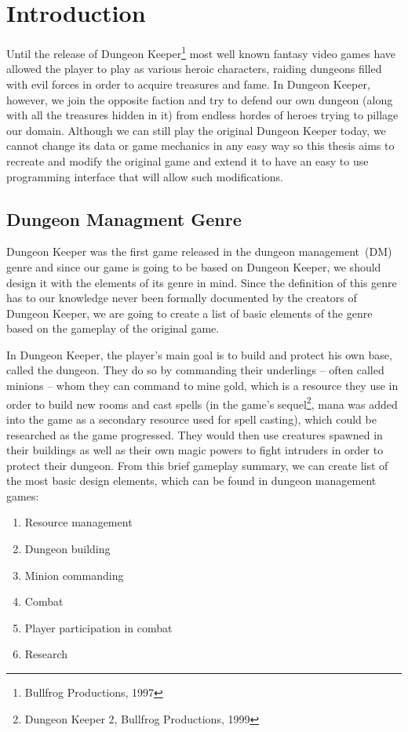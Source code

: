 \chapter{Introduction}

Until the release of Dungeon Keeper\footnote{Bullfrog Productions, 1997} most well known fantasy 
video games have allowed the player to play as various heroic characters, raiding dungeons filled
with evil forces in order to acquire treasures and fame.
In Dungeon Keeper, however, we join the opposite faction and try to defend our own dungeon
(along with all the treasures hidden in it) from endless hordes of heroes trying to pillage our domain.
Although we can still play the original Dungeon Keeper today, we cannot change its data or game mechanics
in any easy way so this thesis aims to recreate and modify the original game and extend it to have an easy to 
use programming interface that will allow such modifications.

\section{Dungeon Managment Genre}

Dungeon Keeper was the first game released in the dungeon management~(DM) genre and since our game is going to be based on
Dungeon Keeper, we should design it with the elements of its genre in mind. Since the definition of this genre has to our
knowledge never been formally documented by the creators of Dungeon Keeper, we are going to create a list of basic elements
of the genre based on the gameplay of the original game.

In Dungeon Keeper, the player's main goal is to build and protect his own base, called the dungeon. They do so by commanding
their underlings -- often called minions -- whom they can command to mine gold, which is a resource they use in order to build new rooms
and cast spells (in the game's sequel\footnote{Dungeon Keeper 2, Bullfrog Productions, 1999}, mana was added into the game
as a secondary resource used for spell casting), which could be researched as the game progressed. They would then use creatures
spawned in their buildings as well as their own magic powers to fight intruders in order to protect their dungeon. 
From this brief gameplay summary, we can create list of the most basic design elements, which can be found in dungeon management games:

\begin{enumerate}[label=\textbf{(E\arabic*)}]
    \item Resource management
    \item Dungeon building
    \item Minion commanding
    \item Combat
    \item Player participation in combat
    \item Research
\end{enumerate}

